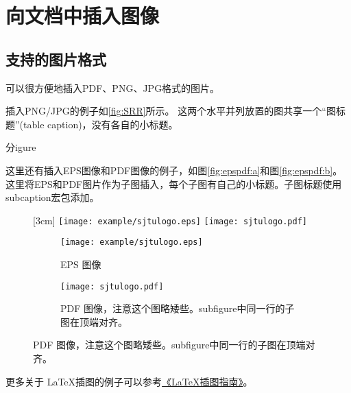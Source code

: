\section{向文档中插入图像}
\label{sec:insertimage}

\subsection{支持的图片格式}
\label{sec:imageformat}

\XeTeX 可以很方便地插入PDF、PNG、JPG格式的图片。

插入PNG/JPG的例子如\ref{fig:SRR}所示。
这两个水平并列放置的图共享一个“图标题”(table caption)，没有各自的小标题。

分igure

这里还有插入EPS图像和PDF图像的例子，如图\ref{fig:epspdf:a}和图\ref{fig:epspdf:b}。这里将EPS和PDF图片作为子图插入，每个子图有自己的小标题。子图标题使用subcaption宏包添加。

\begin{figure}[!htp]
  \centering
  [3cm] %
    {\texttt{[image: example/sjtulogo.eps]}}
  \hspace{4em}
    {\texttt{[image: sjtulogo.pdf]}}
  \label{fig:pdfeps-subcaptionbox}
\end{figure}

\begin{figure}[!htp]
  \centering
  \begin{subfigure}{2.5cm}
    \centering
    \texttt{[image: example/sjtulogo.eps]}
    \caption{EPS 图像}
  \end{subfigure}
  \hspace{4em}
  \begin{subfigure}{0.4\textwidth}
    \centering
    \texttt{[image: sjtulogo.pdf]}
    \caption{PDF 图像，注意这个图略矮些。subfigure中同一行的子图在顶端对齐。}
  \end{subfigure}
  \label{fig:pdfeps-subfigure}
\end{figure}

更多关于 \LaTeX 插图的例子可以参考\href{http://www.cs.duke.edu/junhu/Graphics3.pdf}{《\LaTeX 插图指南》}。

